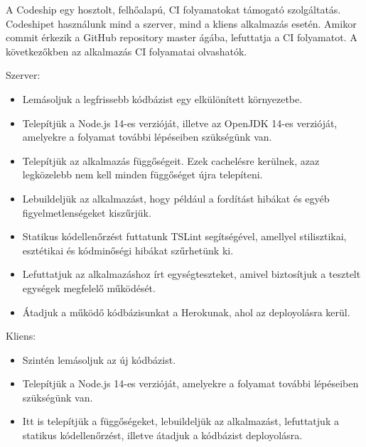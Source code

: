 \documentclass{elteikthesis}
\begin{document}
				A Codeship \cite{codeship} egy hosztolt, felhőalapú, CI folyamatokat támogató szolgáltatás. Codeshipet használunk mind a szerver, mind a kliens alkalmazás esetén. Amikor commit érkezik a GitHub repository master ágába, lefuttatja a CI folyamatot. A következőkben az alkalmazás CI folyamatai olvashatók.

				Szerver:
				\begin{itemize}
					\setlength\itemsep{-0.5em}
					\item Lemásoljuk a legfrissebb kódbázist egy elkülönített környezetbe.
					\item Telepítjük a Node.js 14-es verzióját, illetve az OpenJDK 14-es verzióját, amelyekre a folyamat további lépéseiben szükségünk van.
					\item Telepítjük az alkalmazás függőségeit. Ezek cachelésre kerülnek, azaz legközelebb nem kell minden függőséget újra telepíteni.
					\item Lebuildeljük az alkalmazást, hogy például a fordítást hibákat és egyéb figyelmetlenségeket kiszűrjük.
					\item Statikus kódellenőrzést futtatunk TSLint segítségével, amellyel stilisztikai, esztétikai és kódminőségi hibákat szűrhetünk ki.
					\item Lefuttatjuk az alkalmazáshoz írt egységteszteket, amivel biztosítjuk a tesztelt egységek megfelelő működését.
					\item Átadjuk a működő kódbázisunkat a Herokunak, ahol az deployolásra kerül.
				\end{itemize}

				Kliens:
				\begin{itemize}
					\setlength\itemsep{-0.5em}
					\item Szintén lemásoljuk az új kódbázist.
					\item Telepítjük a Node.js 14-es verzióját, amelyekre a folyamat további lépéseiben szükségünk van.
					\item Itt is telepítjük a függőségeket, lebuildeljük az alkalmazást, lefuttatjuk a statikus kódellenőrzést, illetve átadjuk a kódbázist deployolásra.
				\end{itemize}
			
\end{document}

